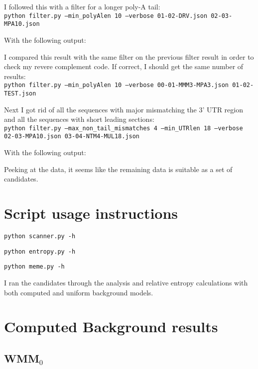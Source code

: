 \documentclass[a4paper, 12pt]{report}
\begin{document}
        I followed this with a filter for a longer poly-A tail: \\
        \texttt{python filter.py --min\_polyAlen 10 --verbose 01-02-DRV.json 02-03-MPA10.json}

        With the following output:
        

        I compared this result with the same filter on the previous filter result
            in order to check my revere complement code.
        If correct, I should get the same number of results: \\
        \texttt{python filter.py --min\_polyAlen 10 --verbose 00-01-MMM3-MPA3.json 01-02-TEST.json}

        Next I got rid of all the sequences with major mismatching the 3' UTR region
            and all the sequences with short leading sections: \\
        \texttt{python filter.py --max\_non\_tail\_mismatches 4 --min\_UTRlen 18 --verbose \\
                02-03-MPA10.json 03-04-NTM4-MUL18.json}

        With the following output:
        
        Peeking at the data, it seems like the remaining data is suitable as a set of candidates.

\section{Script usage instructions}
    \texttt{python scanner.py -h}
    
    \texttt{python entropy.py -h}
    
    \texttt{python meme.py -h}
    

    I ran the candidates through the analysis and relative entropy calculations
        with both computed and uniform background models.

\section{Computed Background results}
    \subsection{WMM$_0$}
        
        
\end{document}
